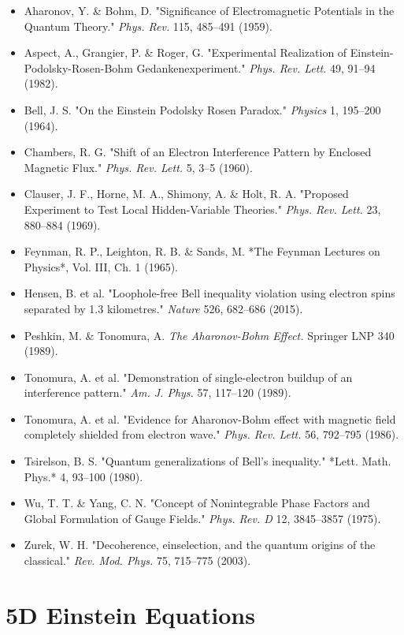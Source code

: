 \documentclass[aps,prd,preprint,superscriptaddress,longbibliography,floatfix]{revtex4-2}
\theoremstyle{remark}
\begin{document}
\begin{itemize}
  \item Aharonov, Y. \& Bohm, D. "Significance of Electromagnetic Potentials in the Quantum Theory." \textit{Phys. Rev.} 115, 485--491 (1959).
  \item Aspect, A., Grangier, P. \& Roger, G. "Experimental Realization of Einstein-Podolsky-Rosen-Bohm Gedankenexperiment." \textit{Phys. Rev. Lett.} 49, 91--94 (1982).
  \item Bell, J. S. "On the Einstein Podolsky Rosen Paradox." \textit{Physics} 1, 195--200 (1964).
  \item Chambers, R. G. "Shift of an Electron Interference Pattern by Enclosed Magnetic Flux." \textit{Phys. Rev. Lett.} 5, 3--5 (1960).
  \item Clauser, J. F., Horne, M. A., Shimony, A. \& Holt, R. A. "Proposed Experiment to Test Local Hidden-Variable Theories." \textit{Phys. Rev. Lett.} 23, 880--884 (1969).
  \item Feynman, R. P., Leighton, R. B. \& Sands, M. *The Feynman Lectures on Physics*, Vol. III, Ch. 1 (1965).
  \item Hensen, B. et al. "Loophole-free Bell inequality violation using electron spins separated by 1.3 kilometres." \textit{Nature} 526, 682--686 (2015).
  \item Peshkin, M. \& Tonomura, A. \textit{The Aharonov-Bohm Effect.} Springer LNP 340 (1989).
  \item Tonomura, A. et al. "Demonstration of single-electron buildup of an interference pattern." \textit{Am. J. Phys.} 57, 117--120 (1989).
  \item Tonomura, A. et al. "Evidence for Aharonov-Bohm effect with magnetic field completely shielded from electron wave." \textit{Phys. Rev. Lett.} 56, 792--795 (1986).
  \item Tsirelson, B. S. "Quantum generalizations of Bell's inequality." *Lett. Math. Phys.* 4, 93--100 (1980).
  \item Wu, T. T. \& Yang, C. N. "Concept of Nonintegrable Phase Factors and Global Formulation of Gauge Fields." \textit{Phys. Rev. D} 12, 3845--3857 (1975).
  \item Zurek, W. H. "Decoherence, einselection, and the quantum origins of the classical." \textit{Rev. Mod. Phys.} 75, 715--775 (2003).
\end{itemize}


\section{5D Einstein Equations}
\end{document}
